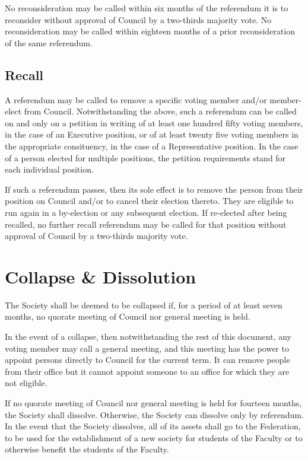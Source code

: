 No reconsideration may be called within six months of the referendum it is to
reconsider without approval of Council by a two-thirds majority vote. No
reconsideration may be called within eighteen months of a prior reconsideration
of the same referendum.

\subsection{Recall}
A referendum may be called to remove a specific voting member and/or member-elect
from Council. Notwithstanding the above, such a referendum can be called on and
only on a petition in writing of at least one hundred fifty voting members, in
the case of an Executive position, or of at least twenty five voting members in
the appropriate consituency, in the case of a Representative position. In the
case of a person elected for multiple positions, the petition requirements stand
for each individual position.

If such a referendum passes, then its sole effect is to remove the person from
their position on Council and/or to cancel their election thereto. They are
eligible to run again in a by-election or any subsequent election. If re-elected
after being recalled, no further recall referendum may be called for that
position without approval of Council by a two-thirds majority vote.

\section{Collapse \& Dissolution}
The Society shall be deemed to be collapsed if, for a period of at least seven
months, no quorate meeting of Council nor general meeting is held.

In the event of a collapse, then notwithstanding the rest of this document, any
voting member may call a general meeting, and this meeting has the power to
appoint persons directly to Council for the current term. It can remove people
from their office but it cannot appoint someone to an office for which they are
not eligible.

If no quorate meeting of Council nor general meeting is held for fourteen months, the
Society shall dissolve. Otherwise, the Society can dissolve only by referendum.
In the event that the Society dissolves, all of its assets shall go to the
Federation, to be used for the establishment of a new society for students of
the Faculty or to otherwise benefit the students of the Faculty.

